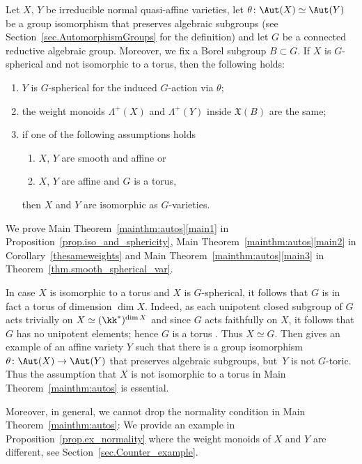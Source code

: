 \begin{maintheorem}
\label{mainthm:autos}
Let $X$, $Y$ be irreducible normal quasi-affine varieties, let
$\theta \colon \Aut(X) \simeq \Aut(Y)$ be a group isomorphism
that preserves algebraic subgroups (see Section~\ref{sec.AutomorphismGroups} for the definition)
and let $G$ be a connected reductive
algebraic group.
Moreover, we fix a Borel subgroup $B \subset G$.
If $X$ is $G$-spherical and not isomorphic to a torus, then the following holds:
\begin{enumerate}
\item \label{main1} $Y$ is $G$-spherical for the induced $G$-action via $\theta$;
\item \label{main2} the weight monoids $\Lambda^+(X)$ and $\Lambda^+(Y)$ inside $\mathfrak{X}(B)$
are the same;
\item \label{main3} if one of the following assumptions holds
\begin{enumerate}\renewcommand{\theenumii}{\roman{enumii}}
\item \label{main3smooth} $X$, $Y$ are smooth and affine or
\item \label{main3toric} $X$, $Y$ are affine and $G$ is a torus,
\end{enumerate}
then $X$ and $Y$ are isomorphic as $G$-varieties.
\end{enumerate}
\end{maintheorem}

We prove Main Theorem~\ref{mainthm:autos}\eqref{main1} in Proposition~\ref{prop.iso_and_sphericity},
Main Theorem~\ref{mainthm:autos}\eqref{main2} in Corollary~\ref{thesameweights}
and Main Theorem~\ref{mainthm:autos}\eqref{main3} in Theorem~\ref{thm.smooth_spherical_var}.

In case $X$ is isomorphic to a torus and $X$ is $G$-spherical, it follows that $G$ is in fact a torus
of dimension $\dim X$. Indeed, as each unipotent closed subgroup of $G$ acts trivially on
$X \simeq (\kk^\ast)^{\dim X}$ and since $G$ acts faithfully on $X$, it follows that $G$ has no unipotent
elements; hence $G$ is a torus \cite[Prop.\,B, \S21.4]{Hu1975Linear-algebraic-g}. Thus $X\simeq G$.
Then \cite[Exam.\,6.17]{LiReUr2018Characterization-o} gives an example
of an affine variety $Y$ such that there is a group isomorphism $\theta \colon \Aut(X) \to \Aut(Y)$
that preserves algebraic subgroups, but~$Y$ is not $G$-toric. Thus the assumption that $X$ is
not isomorphic to a torus in Main Theorem~\ref{mainthm:autos} is essential.

Moreover, in general, we cannot drop the normality condition in Main Theorem~\ref{mainthm:autos}:
We provide an example in Proposition~\ref{prop.ex_normality} where the weight monoids of $X$ and $Y$ are different,
see Section~\ref{sec.Counter_example}.

